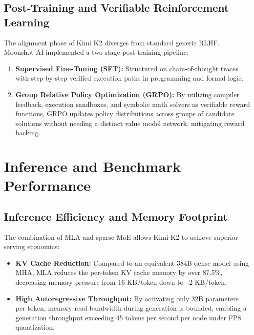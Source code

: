 \documentclass[conference]{IEEEtran}
\begin{document}
\subsection{Post-Training and Verifiable Reinforcement Learning}
The alignment phase of Kimi K2 diverges from standard generic RLHF. Moonshot AI implemented a two-stage post-training pipeline:
\begin{enumerate}
    \item \textbf{Supervised Fine-Tuning (SFT):} Structured on chain-of-thought traces with step-by-step verified execution paths in programming and formal logic.
    \item \textbf{Group Relative Policy Optimization (GRPO):} By utilizing compiler feedback, execution sandboxes, and symbolic math solvers as verifiable reward functions, GRPO updates policy distributions across groups of candidate solutions without needing a distinct value model network, mitigating reward hacking.
\end{enumerate}

\section{Inference and Benchmark Performance}

\subsection{Inference Efficiency and Memory Footprint}
The combination of MLA and sparse MoE allows Kimi K2 to achieve superior serving economics:
\begin{itemize}
    \item \textbf{KV Cache Reduction:} Compared to an equivalent 384B dense model using MHA, MLA reduces the per-token KV cache memory by over 87.5\%, decreasing memory pressure from 16 KB/token down to ~2 KB/token.
    \item \textbf{High Autoregressive Throughput:} By activating only 32B parameters per token, memory read bandwidth during generation is bounded, enabling a generation throughput exceeding 45 tokens per second per node under FP8 quantization.
\end{itemize}
\end{document}
